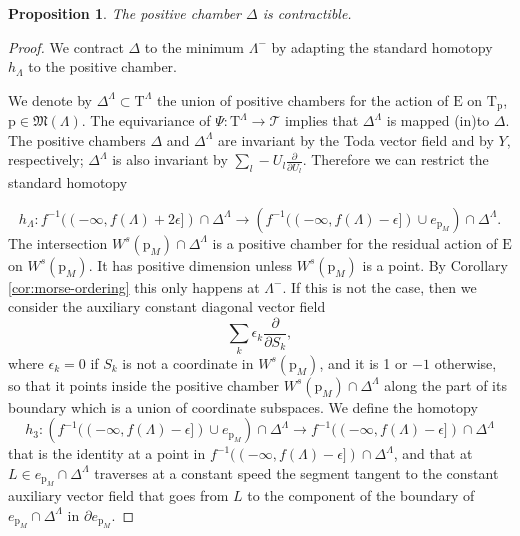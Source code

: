 \documentclass[reqno]{amsart}
\newcommand{\p}{\mathrm{p}}
\newcommand{\cT}{\mathcal{T}}
\newcommand{\E}{\mathrm{E}}
\newcommand{\T}{\mathbb{T}}
\renewcommand{\L}{\mathrm{L}}
\renewcommand{\T}{\mathrm{T}}
\renewcommand{\H}{\mathrm{H}}
\newtheorem{proposition}[theorem]{Proposition}
\begin{document}
\begin{proposition}\label{pro:contractible} The positive chamber $\Delta$ is contractible.
 \end{proposition}
\begin{proof}
We contract $\Delta$ to the minimum $\Lambda^-$ by adapting the
standard homotopy $h_\Lambda$ to the positive chamber.

%
We denote by $\Delta^\Lambda\subset \T^\Lambda$ the union of positive chambers for the action of $\E$ on $\T_\p$, $\p\in \mathfrak{M}(\Lambda)$. The equivariance of $\Psi:\T^\Lambda\to \cT$ implies that $\Delta^\Lambda$ is mapped (in)to $\Delta$. The positive chambers $\Delta$ and $\Delta^\Lambda$ are invariant by the Toda vector field and by $Y$, respectively; $\Delta^\Lambda$ is also invariant by $\sum_l -U_l\frac{\partial}{\partial U_l}$. Therefore we can restrict the standard homotopy

\begin{equation}\label{eq:fundamental-standard-homotopy}
  h_\Lambda:f^{-1}((-\infty, f(\Lambda)+2\epsilon])\cap \Delta^\Lambda\to \left(f^{-1}((-\infty, f(\Lambda)-\epsilon])\cup e_{\p_M}\right)\cap \Delta^\Lambda.
\end{equation}
The intersection $W^s(\p_M)\cap \Delta^\Lambda$ is a positive chamber for the residual action of $\mathrm{E}$ on $W^s(\p_M)$. It has positive dimension  unless $W^s(\p_M)$ is a point. By Corollary \ref{cor:morse-ordering} this only happens at $\Lambda^-$. If this is not the case, then we consider the auxiliary constant diagonal vector field
\[\sum_{k}\epsilon_k\frac{\partial}{\partial S_k},\]
where $\epsilon_k=0$ if $S_k$ is not a coordinate in $W^s(\p_M)$, and it is 1 or $-1$ otherwise, so that it points inside the positive chamber $W^s(\p_M)\cap \Delta^\Lambda$ along the part of its boundary which is a union of coordinate subspaces. We define the homotopy
\[h_3:\left(f^{-1}((-\infty, f(\Lambda)-\epsilon])\cup e_{\p_M}\right)\cap \Delta^\Lambda\to f^{-1}((-\infty, f(\Lambda)-\epsilon])\cap \Delta^\Lambda\]
that is the identity  at a point in $f^{-1}((-\infty, f(\Lambda)-\epsilon])\cap \Delta^\Lambda$, and that at  $L\in e_{\p_M}\cap \Delta^\Lambda$ traverses at a constant speed the segment tangent to the constant auxiliary vector field that goes from $L$ to the component of the boundary of  $e_{\p_M}\cap \Delta^\Lambda$ in $\partial e_{\p_M}$.


\end{proof}
\end{document}
